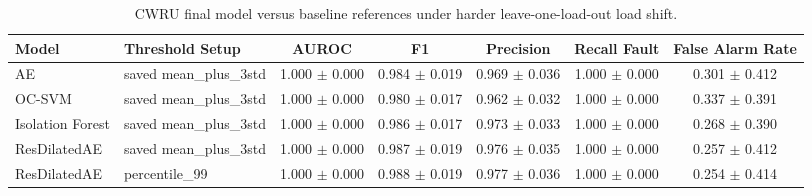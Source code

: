 \begin{table}[t]
\centering
\caption{CWRU final model versus baseline references under harder leave-one-load-out load shift.}
\label{tab:cwru_results}
\begin{tabular}{p{2.0cm} p{2.2cm} c c c c c}
\toprule
Model & Threshold Setup & AUROC & F1 & Precision & Recall Fault & False Alarm Rate \\
\midrule
AE & saved mean\_plus\_3std & 1.000 $\pm$ 0.000 & 0.984 $\pm$ 0.019 & 0.969 $\pm$ 0.036 & 1.000 $\pm$ 0.000 & 0.301 $\pm$ 0.412 \\
OC-SVM & saved mean\_plus\_3std & 1.000 $\pm$ 0.000 & 0.980 $\pm$ 0.017 & 0.962 $\pm$ 0.032 & 1.000 $\pm$ 0.000 & 0.337 $\pm$ 0.391 \\
Isolation Forest & saved mean\_plus\_3std & 1.000 $\pm$ 0.000 & 0.986 $\pm$ 0.017 & 0.973 $\pm$ 0.033 & 1.000 $\pm$ 0.000 & 0.268 $\pm$ 0.390 \\
ResDilatedAE & saved mean\_plus\_3std & 1.000 $\pm$ 0.000 & 0.987 $\pm$ 0.019 & 0.976 $\pm$ 0.035 & 1.000 $\pm$ 0.000 & 0.257 $\pm$ 0.412 \\
ResDilatedAE & percentile\_99 & 1.000 $\pm$ 0.000 & 0.988 $\pm$ 0.019 & 0.977 $\pm$ 0.036 & 1.000 $\pm$ 0.000 & 0.254 $\pm$ 0.414 \\
\bottomrule
\end{tabular}
\end{table}
